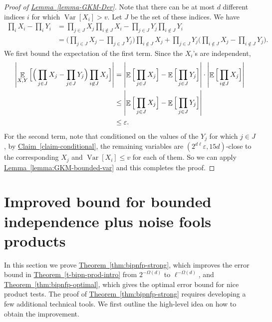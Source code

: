 \documentclass[11pt]{article}
\numberwithin{equation}{section}
\theoremstyle{definition}
\theoremstyle{plain}
\newcommand{\expref}[2]{\hyperref[#2]{#1~\ref{#2}}}
\def\eps{\varepsilon}
\def\Blocklength{\ell}
\DeclarePairedDelimiter{\abs}{\lvert}{\rvert}
\DeclareMathOperator*{\E}{\mathbb{E}}                 %
\DeclareMathOperator*{\Var}{Var}                 %
\begin{document}
  \begin{proof}[Proof of {\expref{Lemma}{lemma-GKM-Der}}]
    Note that there can be at most $d$ different indices $i$ for which $\Var[X_i] > v$.
  	Let $J$ be the set of these indices.
  	We have
  	\begin{align*}
  	  \prod_i X_i - \prod_i Y_i
  	  &= \prod_{j \in J} X_j \prod_{i \not\in J} X_i - \prod_{j \in J} Y_j \prod_{i \not\in J} Y_i \\
  	  &= \Big( \prod_{j \in J} X_j - \prod_{j \in J} Y_j \Big)  \prod_{i \not\in J} X_j + \prod_{j \in J} Y_j \Big( \prod_{i \not\in J} X_j - \prod_{i \not\in J} Y_j \Big) .
  	\end{align*}
  	We first bound the expectation of the first term.
  	Since the $X_i$'s are independent,
  	\begin{align*}
  	  \abs*{ \E_{X, Y} \Big[ \Big( \prod_{j \in J} X_j - \prod_{j \in J} Y_j \Big)  \prod_{i \not\in J} X_j \Big] }
  	  &= \abs*{ \E \Big[ \prod_{j \in J} X_j \Big] - \E \Big[ \prod_{j \in J} Y_j \Big] } \cdot \abs*{ \E \Big[ \prod_{i \not\in J} X_j \Big] } \\
  	  &\le \abs*{ \E \Big[ \prod_{j \in J} X_j \Big] - \E \Big[ \prod_{j \in J} Y_j \Big] } \\
  	  &\le \eps .
  	\end{align*}
    For the second term, note that conditioned on the values of the $Y_j$ for which $j \in J$, by \expref{Claim}{claim-conditional}, the remaining variables are $(2^{d \Blocklength} \eps, 15d)$-close to the corresponding $X_j$ and $\Var[X_i] \le v$ for each of them.
    So we can apply \expref{Lemma}{lemma:GKM-bounded-var} and this completes the proof.
	\end{proof}

  \section{Improved bound for bounded independence plus noise fools products} \label{sec:stronger}
  In this section we prove \expref{Theorem}{thm:bipnfp-strong}, which improves the error bound in \expref{Theorem}{t-bipn-prod-intro} from $2^{-\Omega(d)}$ to $\Blocklength^{-\Omega(d)}$, and \expref{Theorem}{thm:bipnfp-optimal}, which gives the optimal error bound for nice product tests.
  The proof of \expref{Theorem}{thm:bipnfp-strong}  requires developing a few additional technical tools.
  We first outline the high-level idea on how to obtain the improvement.
\end{document}
